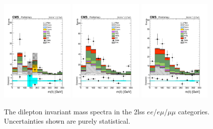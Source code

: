\begin{figure}[htp]
\centering
\includegraphics[width=0.32\textwidth]{ch5_figs/mll_ttH_ee_stackPlot_SR.pdf}
\includegraphics[width=0.32\textwidth]{ch5_figs/mll_ttH_em_stackPlot_SR.pdf}
\includegraphics[width=0.32\textwidth]{ch5_figs/mll_ttH_mm_stackPlot_SR.pdf} \\
\caption[Data/MC comparison of dilepton invariant mass spectra in the signal region]{The dilepton invariant mass spectra in the 2lss $ee$/$e\mu$/$\mu\mu$ categories. Uncertainties shown are purely statistical.}
\label{fig:sr_mll}
\end{figure}

